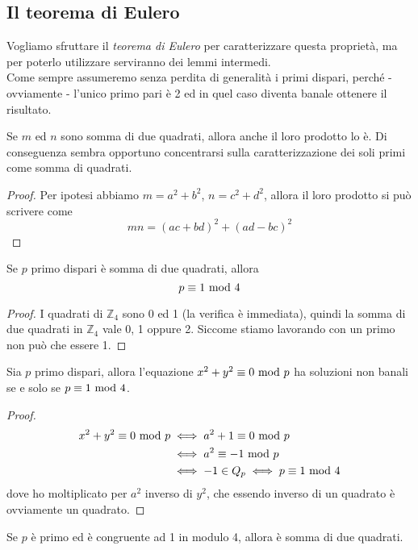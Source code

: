 \subsection{Il teorema di Eulero}
Vogliamo sfruttare il \textit{teorema di Eulero} per caratterizzare questa proprietà, ma per poterlo utilizzare serviranno dei lemmi intermedi. \\ Come sempre assumeremo senza perdita di generalità i primi dispari, perché - ovviamente - l'unico primo pari è 2 ed in quel caso diventa banale ottenere il risultato.
\begin{lemma}
	\label{prodotto_di_somme_di_quadrati}
	Se $m$ ed $n$ sono somma di due quadrati, allora anche il loro prodotto lo è. Di conseguenza sembra opportuno concentrarsi sulla caratterizzazione dei soli primi come somma di quadrati.
\end{lemma}
\begin{proof}
	Per ipotesi abbiamo $m=a^2+b^2$, $n=c^2+d^2$, allora il loro prodotto si può scrivere come
	\begin{equation*}
	mn=(ac+bd)^2+(ad-bc)^2
	\end{equation*}
\end{proof}
\begin{lemma}
	Se $p$ primo dispari è somma di due quadrati, allora 
	\begin{equation*}
	p\equiv1\ \mathrm{mod}\ 4
	\end{equation*}
\end{lemma}
\begin{proof}
	I quadrati di $\mathbb{Z}_4$ sono 0 ed 1 (la verifica è immediata), quindi la somma di due quadrati in $\mathbb{Z}_4$ vale 0, 1 oppure 2.
	Siccome stiamo lavorando con un primo non può che essere 1.
\end{proof}
\begin{lemma}
	Sia $p$ primo dispari, allora l'equazione $x^2+y^2\equiv0\ \mathrm{mod}\ p$ ha soluzioni non banali se e solo se $p\equiv1\ \mathrm{mod}\ 4$.
\end{lemma}
\begin{proof}
	\begin{align*}
		x^2+y^2\equiv0\ \mathrm{mod}\ p 
		& \iff a^2+1\equiv0\ \mathrm{mod}\ p \\
		& \iff a^2\equiv-1\ \mathrm{mod}\ p \\
		& \iff -1 \in Q_p \iff p\equiv1\ \mathrm{mod}\ 4
	\end{align*}
	dove ho moltiplicato per $a^2$ inverso di $y^2$, che essendo inverso di un quadrato è ovviamente un quadrato.
\end{proof}
\begin{lemma}
	Se $p$ è primo ed è congruente ad 1 in modulo 4, allora è somma di due quadrati.
\end{lemma}
